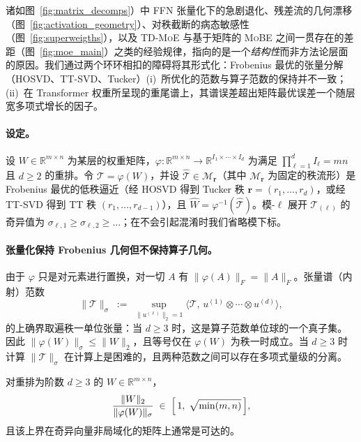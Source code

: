 \documentclass[11pt]{article}
\begin{document}
\begin{mainpart}
诸如图~\ref{fig:matrix_decomps}）中 FFN 张量化下的急剧退化、残差流的几何漂移（图~\ref{fig:activation_geometry}）、对秩截断的病态敏感性（图~\ref{fig:superweigths}），以及 \textsc{TD-MoE} 与基于矩阵的 \textsc{MoBE} 之间一贯存在的差距（图~\ref{fig:moe_main}）之类的经验规律，指向的是一个\textit{结构性}而非方法论层面的原因。我们通过两个环环相扣的障碍将其形式化：Frobenius 最优的张量分解（HOSVD、TT-SVD、Tucker）(i)~所优化的范数与算子范数的保持并不一致；(ii)~在 Transformer 权重所呈现的重尾谱上，其谱误差超出矩阵最优误差一个随层宽多项式增长的因子。

\paragraph{设定。}
设 $W \in \mathbb{R}^{m \times n}$ 为某层的权重矩阵，$\varphi : \mathbb{R}^{m \times n} \to \mathbb{R}^{I_1 \times \cdots \times I_d}$ 为满足 $\prod \limits_{\ell = 1}^d I_\ell = mn$ 且 $d \geq 2$ 的重排。令 $\mathcal{T} = \varphi(W)$，并设 $\widehat{\mathcal{T}} \in \mathcal{M}_{\mathbf{r}}$（其中 $\mathcal{M}_{\mathbf{r}}$ 为固定的秩流形）是 Frobenius 最优的低秩逼近（经 HOSVD 得到 Tucker 秩 $\mathbf{r}=(r_1,\dots,r_d)$，或经 TT-SVD 得到 TT 秩 $(r_1,\dots,r_{d-1})$），且 $\widehat{W} = \varphi^{-1}(\widehat{\mathcal{T}})$。模-$\ell$ 展开 $\mathcal{T}_{(\ell)}$ 的奇异值为 $\sigma_{\ell,1} \geq \sigma_{\ell,2} \geq \dots$；在不会引起混淆时我们省略模下标。

\paragraph{张量化保持 Frobenius 几何但不保持算子几何。} 由于 $\varphi$ 只是对元素进行置换，对一切 $A$ 有 $\|\varphi(A)\|_F = \|A\|_F$。张量谱（内射）范数
\begin{equation}
\|\mathcal{T}\|_\sigma \;:=\; \sup_{\|u^{(\ell)}\|_2 = 1} \bigl\langle \mathcal{T},\, u^{(1)} \otimes \cdots \otimes u^{(d)} \bigr\rangle,
\label{eq:tensor-spectral}
\end{equation}
的上确界取遍秩一单位张量：当 $d \geq 3$ 时，这是算子范数单位球的一个真子集。因此 $\|\varphi(W)\|_\sigma \leq \|W\|_2$，且等号仅在 $\varphi(W)$ 为秩一时成立。当 $d \geq 3$ 时计算 $\|\mathcal{T}\|_\sigma$ 在计算上是困难的，且两种范数之间可以存在多项式量级的分离。

\begin{proposition} 
\label{prop:gap}
对重排为阶数 $d \geq 3$ 的 $W \in \mathbb{R}^{m \times n}$，
\begin{equation}
\frac{\|W\|_2}{\|\varphi(W)\|_\sigma} \;\in\; \Bigl[\,1,\; \sqrt{\min(m,n)}\,\Bigr],
\label{eq:gap-bound}
\end{equation}
且该上界在奇异向量非局域化的矩阵上通常是可达的。
\end{proposition}


\end{mainpart}
\end{document}
